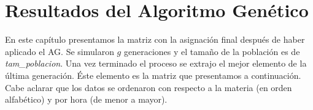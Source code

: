 \chapter{Resultados del Algoritmo Genético}

En este capítulo presentamos la matriz con la asignación final después de haber aplicado el AG. Se simularon $g$ generaciones y el tamaño de la población es de \textit{tam\_poblacion}. Una vez terminado el proceso se extrajo el mejor elemento de la última generación. Éste elemento es la matriz que presentamos a continuación. Cabe aclarar que los datos se ordenaron con respecto a la materia (en orden alfabético) y por hora (de menor a mayor).

\dfNmatAsigFinal